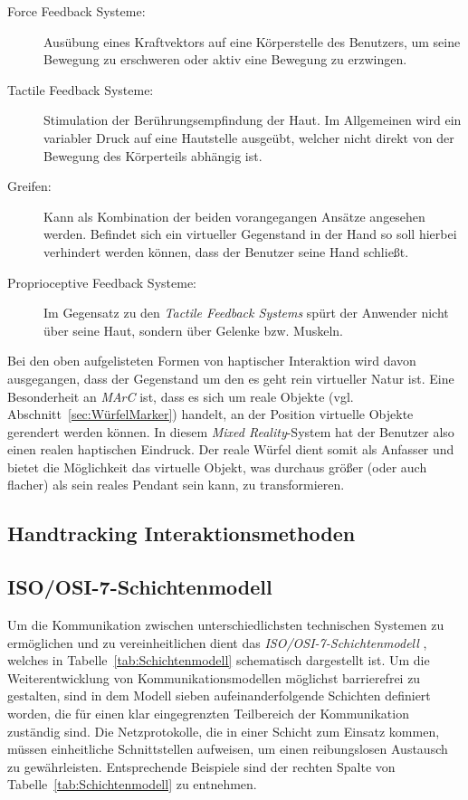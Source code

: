 \begin{description}
	\item[Force Feedback Systeme:] Ausübung eines Kraftvektors auf eine Körperstelle des Benutzers, um seine Bewegung zu erschweren oder aktiv eine Bewegung zu erzwingen. %
	\item[Tactile Feedback Systeme:] Stimulation der Berührungsempfindung der Haut. Im Allgemeinen wird ein variabler Druck auf eine Hautstelle ausgeübt, welcher nicht direkt von der Bewegung des Körperteils abhängig ist.
	\item[Greifen:] Kann als Kombination der beiden vorangegangen Ansätze angesehen werden. Befindet sich ein virtueller Gegenstand in der Hand so soll hierbei verhindert werden können, dass der Benutzer seine Hand schließt. 
	\item[Proprioceptive Feedback Systeme:] Im Gegensatz zu den \textit{Tactile Feedback Systems} spürt der Anwender nicht über seine Haut, sondern über Gelenke bzw. Muskeln. 
\end{description}

Bei den oben aufgelisteten Formen von haptischer Interaktion wird davon ausgegangen, dass der Gegenstand um den es geht rein virtueller Natur ist. Eine Besonderheit an \textit{MArC} ist, dass es sich um reale Objekte (vgl. Abschnitt~\ref{sec:WürfelMarker}) handelt, an der Position virtuelle Objekte gerendert werden können. In diesem \textit{Mixed Reality}-System hat der Benutzer also einen realen haptischen Eindruck. Der reale Würfel dient somit als Anfasser und bietet die Möglichkeit das virtuelle Objekt, was durchaus größer (oder auch flacher) als sein reales Pendant sein kann, zu transformieren. 



\subsection{Handtracking Interaktionsmethoden}\label{sec:HandtrackingAnwendungen}
\subsection{ISO/OSI-7-Schichtenmodell}\label{sec:Netzwerk}
Um die Kommunikation zwischen unterschiedlichsten technischen Systemen zu ermöglichen und zu vereinheitlichen dient das \textit{ISO/OSI-7-Schichtenmodell} \cite{ITU}, welches in Tabelle~\ref{tab:Schichtenmodell} schematisch dargestellt ist. Um die Weiterentwicklung von Kommunikationsmodellen möglichst barrierefrei zu gestalten, sind in dem Modell sieben aufeinanderfolgende Schichten definiert worden, die für einen klar eingegrenzten Teilbereich der Kommunikation zuständig sind. Die Netzprotokolle, die in einer Schicht zum Einsatz kommen, müssen einheitliche Schnittstellen aufweisen, um einen reibungslosen Austausch zu gewährleisten. Entsprechende Beispiele sind der rechten Spalte von Tabelle~\ref{tab:Schichtenmodell} zu entnehmen.\\

